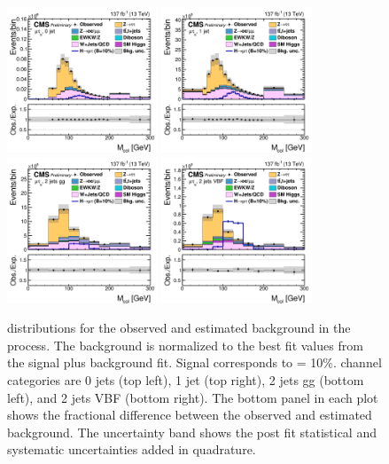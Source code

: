\begin{figure}[htbp!]
  \centering
  \includegraphics[width=0.4\textwidth]{plots/chapter9/CB/mutau/0jet.png}
  \includegraphics[width=0.4\textwidth]{plots/chapter9/CB/mutau/1jet.png} \\
  \includegraphics[width=0.4\textwidth]{plots/chapter9/CB/mutau/2jet_gg.png}
  \includegraphics[width=0.4\textwidth]{plots/chapter9/CB/mutau/2jet_vbf.png} \\
  \caption{\mcol distributions for the observed and estimated background in the \Hmuhad process. The background is normalized to the best fit values from the signal plus background fit. Signal corresponds to \BHmt = 10\%. \Hmuhad channel categories are 0 jets (top left), 1 jet (top right), 2 jets gg (bottom left), and 2 jets VBF (bottom right). The bottom panel in each plot shows the fractional difference between the observed and estimated background. The uncertainty band shows the post fit statistical and systematic uncertainties added in quadrature.}
  \label{fig:mcol_muhad}
\end{figure}

